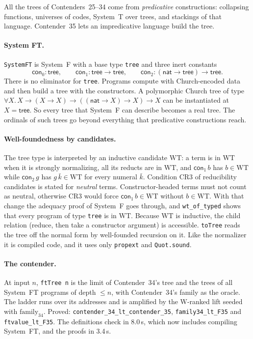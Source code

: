 \documentclass[11pt]{article}
\theoremstyle{definition}
\theoremstyle{remark}
\newcommand{\lean}[1]{\texttt{#1}}
\begin{document}
All the trees of Contenders~25--34 come from \emph{predicative} constructions:
collapsing functions, universes of codes, System~T over trees, and stackings of
that language. Contender~35 lets an impredicative language build the tree.

\paragraph{System FT.} \lean{SystemFT} is System~F with a base type
\lean{tree} and three inert constants
\[
\mathsf{con}_0:\mathsf{tree},\qquad
\mathsf{con}_1:\mathsf{tree}\to\mathsf{tree},\qquad
\mathsf{con}_2:(\mathsf{nat}\to\mathsf{tree})\to\mathsf{tree}.
\]
There is no eliminator for \lean{tree}. Programs compute with Church-encoded
data and then build a tree with the constructors. A polymorphic Church tree of
type $\forall X.\,X\to(X\to X)\to((\mathsf{nat}\to X)\to X)\to X$ can be
instantiated at $X=\mathsf{tree}$. So every tree that System~F can describe
becomes a real tree. The ordinals of such trees go beyond everything that
predicative constructions reach.

\paragraph{Well-foundedness by candidates.} The tree type is interpreted by
an inductive candidate $\mathrm{WT}$: a term is in $\mathrm{WT}$ when it is
strongly normalizing, all its reducts are in $\mathrm{WT}$, and
$\mathsf{con}_1\,b$ has $b\in\mathrm{WT}$ while $\mathsf{con}_2\,g$ has
$g\,\bar k\in\mathrm{WT}$ for every numeral $\bar k$. Condition CR3 of
reducibility candidates is stated for \emph{neutral} terms. Constructor-headed
terms must not count as neutral, otherwise CR3 would force
$\mathsf{con}_1\,b\in\mathrm{WT}$ without $b\in\mathrm{WT}$. With that change
the adequacy proof of System~F goes through, and
\lean{wt\_of\_typed} shows that every program of type \lean{tree} is in
$\mathrm{WT}$. Because $\mathrm{WT}$ is inductive, the child relation (reduce,
then take a constructor argument) is accessible. \lean{toTree} reads the tree off
the normal form by well-founded recursion on it. Like the normalizer it is
compiled code, and it uses only \lean{propext} and \lean{Quot.sound}.

\paragraph{The contender.} At input $n$, \lean{ftTree n} is the limit of
Contender~34's tree and the trees of all System~FT programs of depth $\le n$,
with Contender~34's family as the oracle. The ladder runs over its addresses
and is amplified by the W-ranked lift seeded with
$\mathrm{family}_{34}$. Proved: \lean{contender\_34\_lt\_\allowbreak contender\_35},
\lean{family34\_lt\_F35} and \lean{ftvalue\_lt\_F35}. The definitions check in
8.0\,s, which now includes compiling System~FT, and the proofs in 3.4\,s.
\end{document}
